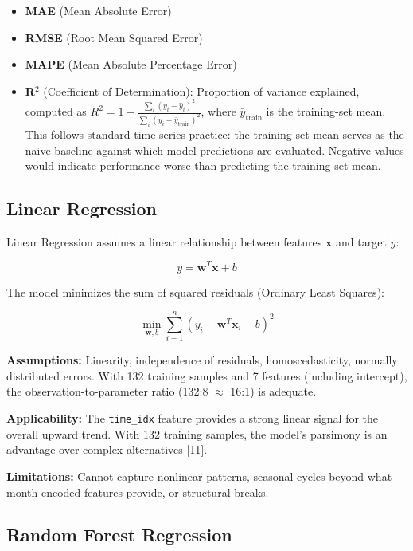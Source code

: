 \documentclass[
]{article}
\providecommand{\tightlist}{%
  \setlength{\itemsep}{0pt}\setlength{\parskip}{0pt}}
\begin{document}
\begin{itemize}
\tightlist
\item
  \textbf{MAE} (Mean Absolute Error)
\item
  \textbf{RMSE} (Root Mean Squared Error)
\item
  \textbf{MAPE} (Mean Absolute Percentage Error)
\item
  \textbf{R\(^2\)} (Coefficient of Determination): Proportion of
  variance explained, computed as
  \(R^2 = 1 - \frac{\sum_i (y_i - \hat{y}_i)^2}{\sum_i (y_i - \bar{y}_{\mathrm{train}})^2}\),
  where \(\bar{y}_{\mathrm{train}}\) is the training-set mean. This
  follows standard time-series practice: the training-set mean serves as
  the naive baseline against which model predictions are evaluated.
  Negative values would indicate performance worse than predicting the
  training-set mean.
\end{itemize}

\subsection{Linear Regression}\label{linear-regression}

Linear Regression assumes a linear relationship between features
\(\mathbf{x}\) and target \(y\):

\[y = \mathbf{w}^T \mathbf{x} + b\]

The model minimizes the sum of squared residuals (Ordinary Least
Squares):

\[\min_{\mathbf{w}, b} \sum_{i=1}^{n} (y_i - \mathbf{w}^T \mathbf{x}_i - b)^2\]

\textbf{Assumptions:} Linearity, independence of residuals,
homoscedasticity, normally distributed errors. With 132 training samples
and 7 features (including intercept), the observation-to-parameter ratio
(132:8 \(\approx\) 16:1) is adequate.

\textbf{Applicability:} The \texttt{time\_idx} feature provides a strong
linear signal for the overall upward trend. With 132 training samples,
the model's parsimony is an advantage over complex alternatives
{[}11{]}.

\textbf{Limitations:} Cannot capture nonlinear patterns, seasonal cycles
beyond what month-encoded features provide, or structural breaks.

\subsection{Random Forest Regression}\label{random-forest-regression}
\end{document}
